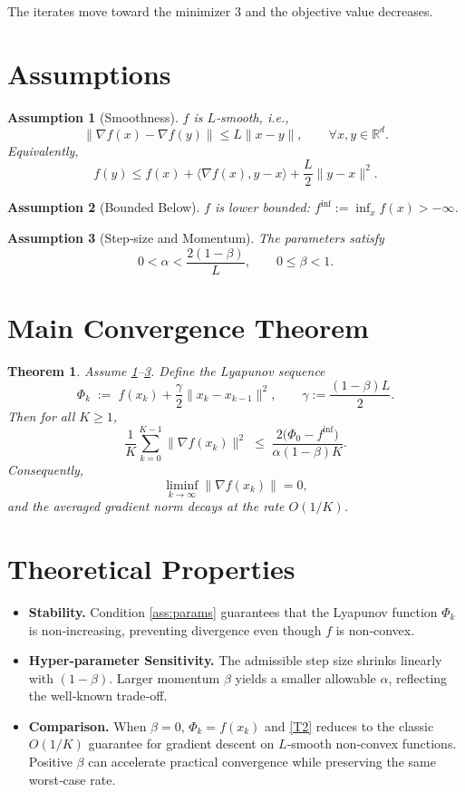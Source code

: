 \documentclass{article}
\newtheorem{theorem}{Theorem}
\newtheorem{assumption}{Assumption}
\begin{document}
The iterates move toward the minimizer $3$ and the objective value decreases.

\newpage
\section*{Assumptions}
\begin{assumption}[Smoothness]\label{ass:smooth}
$f$ is $L$‑smooth, i.e.,
\[
\|\nabla f(x)-\nabla f(y)\|\le L\|x-y\|,\qquad\forall x,y\in\mathbb{R}^{d}.
\tag{A1}
\]
Equivalently,
\[
f(y)\le f(x)+\langle\nabla f(x),y-x\rangle+\frac{L}{2}\|y-x\|^{2}.
\tag{A1'}
\]
\end{assumption}

\begin{assumption}[Bounded Below]\label{ass:bound}
$f$ is lower bounded: $f^{\inf}:=\inf_{x}f(x)>-\infty$.
\end{assumption}

\begin{assumption}[Step‑size and Momentum]\label{ass:params}
The parameters satisfy
\[
0<\alpha<\frac{2(1-\beta)}{L},\qquad 0\le\beta<1.
\tag{A3}
\]
\end{assumption}

\section*{Main Convergence Theorem}
\begin{theorem}\label{thm:main}
Assume \ref{ass:smooth}–\ref{ass:params}. Define the Lyapunov sequence
\[
\Phi_{k}\;:=\; f(x_{k})+\frac{\gamma}{2}\|x_{k}-x_{k-1}\|^{2},
\qquad 
\gamma:=\frac{(1-\beta)L}{2}.
\tag{T1}
\]
Then for all $K\ge1$,
\[
\frac{1}{K}\sum_{k=0}^{K-1}\|\nabla f(x_{k})\|^{2}
\;\le\;
\frac{2\bigl(\Phi_{0}-f^{\inf}\bigr)}{\alpha(1-\beta)K}.
\tag{T2}
\]
Consequently,
\[
\liminf_{k\to\infty}\|\nabla f(x_{k})\|=0,
\]
and the averaged gradient norm decays at the rate $O(1/K)$.
\end{theorem}

\section*{Theoretical Properties}
\begin{itemize}
\item \textbf{Stability.} Condition \eqref{ass:params} guarantees that the Lyapunov function $\Phi_{k}$ is non‑increasing, preventing divergence even though $f$ is non‑convex.
\item \textbf{Hyper‑parameter Sensitivity.} The admissible step size shrinks linearly with $(1-\beta)$. Larger momentum $\beta$ yields a smaller allowable $\alpha$, reflecting the well‑known trade‑off.
\item \textbf{Comparison.} When $\beta=0$, $\Phi_{k}=f(x_{k})$ and \eqref{T2} reduces to the classic $O(1/K)$ guarantee for gradient descent on $L$‑smooth non‑convex functions. Positive $\beta$ can accelerate practical convergence while preserving the same worst‑case rate.
\end{itemize}
\end{document}
